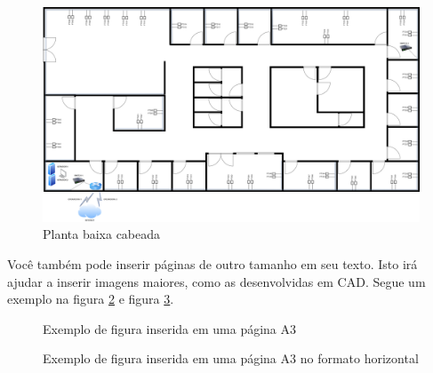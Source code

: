 \documentclass[	DIV=calc,%
							paper=a4,%
							fontsize=12pt,%
							onecolumn]{scrartcl}	 					%
\begin{document}
\begin{figure}
	\includegraphics[height=\textwidth,angle=-90,scale=0.8]{planta2d_cabeada}
	\caption{Planta baixa cabeada}
	\label{planta2d_cabeada}
\end{figure}

Você também pode inserir páginas de outro tamanho em seu texto. Isto irá ajudar a inserir imagens maiores, como as desenvolvidas em CAD. Segue um exemplo na figura \ref{fig4} e figura \ref{fig5}.


\clearpage
{}
\recalctypearea

\begin{figure}
	\centering
	\caption{Exemplo de figura inserida em uma página A3}
	\label{fig4}
\end{figure}

\clearpage
{}
\recalctypearea


\clearpage
{}
\recalctypearea

	
\begin{figure}
	\noindent{}
	\caption{Exemplo de figura inserida em uma página A3 no formato horizontal}
	\label{fig5}
\end{figure}
\end{document}
